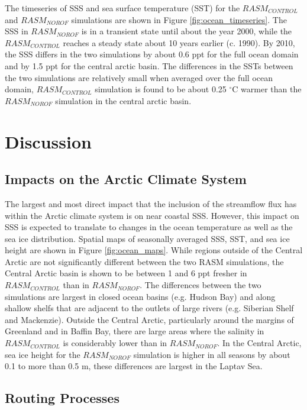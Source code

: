\documentclass[jgrga, draft]{agutex}
\begin{document}
\begin{article}
The timeseries of SSS and sea surface temperature (SST) for the $RASM_{CONTROL}$ and $RASM_{NOROF}$ simulations are shown in Figure \ref{fig:ocean_timeseries}.
The SSS in $RASM_{NOROF}$ is in a transient state until about the year 2000, while the $RASM_{CONTROL}$ reaches a steady state about 10 years earlier (c. 1990).
By 2010, the SSS differs in the two simulations by about 0.6 ppt for the full ocean domain and by 1.5 ppt for the central arctic basin.
The differences in the SSTs between the two simulations are relatively small when averaged over the full ocean domain, $RASM_{CONTROL}$ simulation is found to be about 0.25 $^{\circ}$C warmer than the $RASM_{NOROF}$ simulation in the central arctic basin.

\section{Discussion}
\label{sec:discussion}

\subsection{Impacts on the Arctic Climate System}
The largest and most direct impact that the inclusion of the streamflow flux has within the Arctic climate system is on near coastal SSS.
However, this impact on SSS is expected to translate to changes in the ocean temperature as well as the sea ice distribution.
Spatial maps of seasonally averaged SSS, SST, and sea ice height are shown in Figure \ref{fig:ocean_maps}.
While regions outside of the Central Arctic are not significantly different between the two RASM simulations, the Central Arctic basin is shown to be between 1 and 6 ppt fresher in $RASM_{CONTROL}$ than in $RASM_{NOROF}$.
The differences between the two simulations are largest in closed ocean basins (e.g. Hudson Bay) and along shallow shelfs that are adjacent to the outlets of large rivers (e.g. Siberian Shelf and Mackenzie).
Outside the Central Arctic, particularly around the margins of Greenland and in Baffin Bay, there are large areas where the salinity in $RASM_{CONTROL}$ is considerably lower than in $RASM_{NOROF}$.
In the Central Arctic, sea ice height for the $RASM_{NOROF}$ simulation is higher in all seasons by about 0.1 to more than 0.5 m, these differences are largest in the Laptav Sea.
\subsection{Routing Processes}


\end{article}
\end{document}
